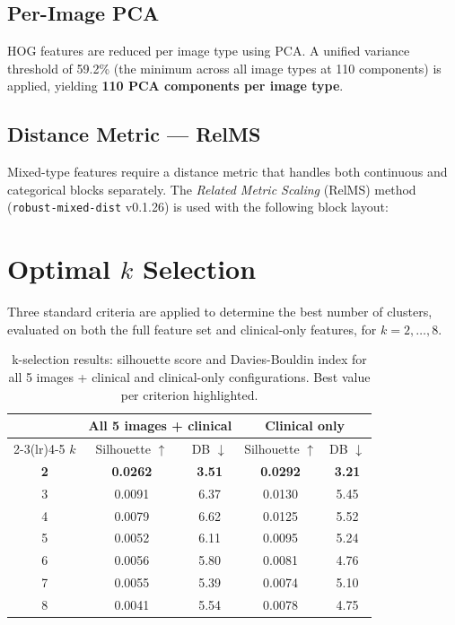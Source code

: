 \documentclass[12pt, a4paper]{article}
\begin{document}
\subsection{Per-Image PCA}
HOG features are reduced per image type using PCA. A unified variance threshold of
59.2\% (the minimum across all image types at 110 components) is applied, yielding
\textbf{110 PCA components per image type}.

\subsection{Distance Metric — RelMS}
Mixed-type features require a distance metric that handles both continuous and categorical
blocks separately. The \textit{Related Metric Scaling} (RelMS) method
(\texttt{robust-mixed-dist} v0.1.26) is used with the following block layout:
\begin{center}
\end{center}

\section{Optimal $k$ Selection}

Three standard criteria are applied to determine the best number of clusters,
evaluated on both the full feature set and clinical-only features, for $k = 2, \ldots, 8$.

\begin{table}[H]
\centering
\caption{k-selection results: silhouette score and Davies-Bouldin index for all 5 images + clinical
and clinical-only configurations. Best value per criterion highlighted.}
\begin{tabular}{ccccc}
\toprule
& \multicolumn{2}{c}{\textbf{All 5 images + clinical}} &
  \multicolumn{2}{c}{\textbf{Clinical only}} \\
\cmidrule(lr){2-3}\cmidrule(lr){4-5}
$k$ & Silhouette $\uparrow$ & DB $\downarrow$ & Silhouette $\uparrow$ & DB $\downarrow$ \\
\midrule
\textbf{2} & \textbf{0.0262} & \textbf{3.51} & \textbf{0.0292} & \textbf{3.21} \\
3 & 0.0091 & 6.37 & 0.0130 & 5.45 \\
4 & 0.0079 & 6.62 & 0.0125 & 5.52 \\
5 & 0.0052 & 6.11 & 0.0095 & 5.24 \\
6 & 0.0056 & 5.80 & 0.0081 & 4.76 \\
7 & 0.0055 & 5.39 & 0.0074 & 5.10 \\
8 & 0.0041 & 5.54 & 0.0078 & 4.75 \\
\bottomrule
\end{tabular}
\end{table}
\end{document}
